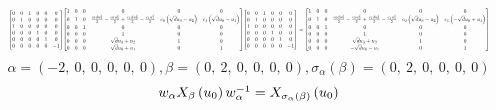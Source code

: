 \documentclass[11pt]{article}
\theoremstyle{definition}
\begin{document}
\[
\scaletoalign{\textwidth}{{\left[\begin{matrix}0 & 0 & 1 & 0 & 0 & 0\\0 & 1 & 0 & 0 & 0 & 0\\1 & 0 & 0 & 0 & 0 & 0\\0 & 0 & 0 & 1 & 0 & 0\\0 & 0 & 0 & 0 & 1 & 0\\0 & 0 & 0 & 0 & 0 & -1\end{matrix}\right]} {\left[\begin{matrix}1 & 0 & 0 & 0 & 0 & 0\\0 & 1 & 0 & \frac{c_{0} d u_{3}^{2}}{2} - \frac{c_{0} u_{2}^{2}}{2} + \frac{c_{1} d u_{0}^{2}}{2} - \frac{c_{1} u_{1}^{2}}{2} & c_{0} \left(\sqrt{d} u_{3} - u_{2}\right) & c_{1} \left(\sqrt{d} u_{0} - u_{1}\right)\\0 & 0 & 1 & 0 & 0 & 0\\0 & 0 & 0 & 1 & 0 & 0\\0 & 0 & 0 & \sqrt{d} u_{3} + u_{2} & 1 & 0\\0 & 0 & 0 & \sqrt{d} u_{0} + u_{1} & 0 & 1\end{matrix}\right]} {\left[\begin{matrix}0 & 0 & 1 & 0 & 0 & 0\\0 & 1 & 0 & 0 & 0 & 0\\1 & 0 & 0 & 0 & 0 & 0\\0 & 0 & 0 & 1 & 0 & 0\\0 & 0 & 0 & 0 & 1 & 0\\0 & 0 & 0 & 0 & 0 & -1\end{matrix}\right]} = {\left[\begin{matrix}1 & 0 & 0 & 0 & 0 & 0\\0 & 1 & 0 & \frac{c_{0} d u_{3}^{2}}{2} - \frac{c_{0} u_{2}^{2}}{2} + \frac{c_{1} d u_{0}^{2}}{2} - \frac{c_{1} u_{1}^{2}}{2} & c_{0} \left(\sqrt{d} u_{3} - u_{2}\right) & c_{1} \left(- \sqrt{d} u_{0} + u_{1}\right)\\0 & 0 & 1 & 0 & 0 & 0\\0 & 0 & 0 & 1 & 0 & 0\\0 & 0 & 0 & \sqrt{d} u_{3} + u_{2} & 1 & 0\\0 & 0 & 0 & - \sqrt{d} u_{0} - u_{1} & 0 & 1\end{matrix}\right]}}
\]
\[
\alpha = \left( -2, \  0, \  0, \  0, \  0, \  0\right), \beta = \left( 0, \  2, \  0, \  0, \  0, \  0\right), \sigma_{\alpha}(\beta) = \left( 0, \  2, \  0, \  0, \  0, \  0\right)
\]
\[
\scaletoalign{\textwidth}{w_{\alpha} X_{\beta}\left(u_{0}\right) w_{\alpha}^{-1} = X_{\sigma_{\alpha}\left(\beta\right)}\left(u_{0}\right)}
\]
\end{document}
